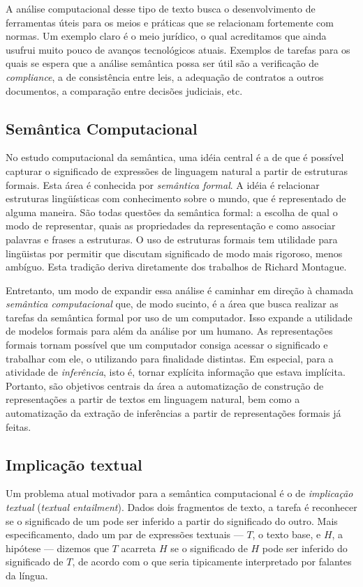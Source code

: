 \documentclass[12pt, a4paper, twoside]{article}
\begin{document}
A análise computacional desse tipo de texto busca o desenvolvimento de ferramentas úteis para os meios e práticas que se relacionam fortemente com normas. Um exemplo claro é o meio jurídico, o qual acreditamos que ainda usufrui muito pouco de avanços tecnológicos atuais. Exemplos de tarefas para os quais se espera que a análise semântica possa ser útil são a verificação de \textit{compliance}, a de consistência entre leis, a adequação de contratos a outros documentos, a comparação entre decisões judiciais, etc.

\subsection{Semântica Computacional}
No estudo computacional da semântica, uma idéia central é a de que é possível capturar o significado de expressões de linguagem natural a partir de estruturas formais. Esta área é conhecida por \textsl{semântica formal}. A idéia é relacionar estruturas lingüísticas com conhecimento sobre o mundo, que é representado de alguma maneira. São todas questões da semântica formal: a escolha de qual o modo de representar, quais as propriedades da representação e como associar palavras e frases a estruturas. O uso de estruturas formais tem utilidade para lingüistas por permitir que discutam significado de modo mais rigoroso, menos ambíguo. Esta tradição deriva diretamente dos trabalhos de Richard Montague. \citep[p. xii]{BlackburnBos:2005} 

Entretanto, um modo de expandir essa análise é caminhar em direção à chamada \textsl{semântica computacional} que, de modo sucinto, é a área que busca realizar as tarefas da semântica formal por uso de um computador. Isso expande a utilidade de modelos formais para além da análise por um humano. As representações formais tornam possível que um computador consiga acessar o significado e trabalhar com ele, o utilizando para finalidade distintas. Em especial, para a atividade de \textit{inferência}, isto é, tornar explícita informação que estava implícita. Portanto, são objetivos centrais da área a automatização de construção de representações a partir de textos em linguagem natural, bem como a automatização da extração de inferências a partir de representações formais já feitas.

\subsection{Implicação textual}
Um problema atual motivador para a semântica computacional é o de \textsl{implicação textual}  (\textit{textual entailment}). Dados dois fragmentos de texto, a tarefa é reconhecer se o significado de um pode ser inferido a partir do significado do outro. Mais especificamento, dado um par de expressões textuais --- $T$, o texto base, e $H$, a hipótese --- dizemos que $T$ acarreta $H$ se o significado de $H$ pode ser inferido do significado de $T$, de acordo com o que seria tipicamente interpretado por falantes da língua. \citep[p.1]{TextEnt}
\end{document}
